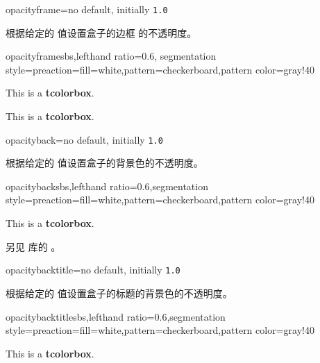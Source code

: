 \begin{docTcbKey}{opacityframe}{=}{no default, initially \texttt{1.0}}

根据给定的  值设置盒子的边框%
的不透明度。
\begin{exdispExample*}{opacityframe}{sbs,lefthand ratio=0.6,
  segmentation style={preaction={fill=white},pattern=checkerboard,pattern color=gray!40}
  }
\begin{tcolorbox}[opacityframe=0.25
  ,title=设置了边框的颜色和透明度,
  colframe=red]
This is a \textbf{tcolorbox}.
\end{tcolorbox}
\begin{tcolorbox}[colframe=red
  ,title=设置了边框的颜色]
This is a \textbf{tcolorbox}.
\end{tcolorbox}
\end{exdispExample*}
\end{docTcbKey}

\begin{docTcbKey}{opacityback}{=}{no default, initially \texttt{1.0}}

根据给定的  值设置盒子的背景色的不透明度。
\begin{exdispExample*}{opacityback}{sbs,lefthand ratio=0.6,segmentation style={preaction={fill=white},pattern=checkerboard,pattern color=gray!40}}
\begin{tcolorbox}[standard jigsaw,colframe=red,
  opacityframe=0.5, opacityback=0.5]
This is a \textbf{tcolorbox}.
\end{tcolorbox}
\end{exdispExample*}
\end{docTcbKey}

另见  库的 。

 

\begin{docTcbKey}{opacitybacktitle}{=}{no default, initially \texttt{1.0}}

根据给定的  值设置盒子的标题的背景色的不透明度。
\begin{exdispExample*}{opacitybacktitle}{sbs,lefthand ratio=0.6,segmentation style={preaction={fill=white},pattern=checkerboard,pattern color=gray!40}}
\begin{tcolorbox}[standard jigsaw,colframe=red,
  opacityframe=0.5, opacitybacktitle=0.5,
  title filled, title=This is a title]
This is a \textbf{tcolorbox}.
\end{tcolorbox}
\end{exdispExample*}
\end{docTcbKey}


